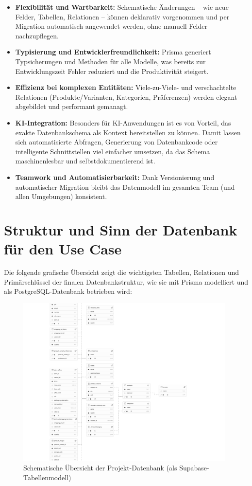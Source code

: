 \begin{itemize}
    \item \textbf{Flexibilität und Wartbarkeit:} Schematische Änderungen – wie neue Felder, Tabellen, Relationen – können deklarativ vorgenommen und per Migration automatisch angewendet werden, ohne manuell Felder nachzupflegen.
    \item \textbf{Typisierung und Entwicklerfreundlichkeit:} Prisma generiert Typsicherungen und Methoden für alle Modelle, was bereits zur Entwicklungszeit Fehler reduziert und die Produktivität steigert.
    \item \textbf{Effizienz bei komplexen Entitäten:} Viele-zu-Viele- und verschachtelte Relationen (Produkte/Varianten, Kategorien, Präferenzen) werden elegant abgebildet und performant gemanagt.
    \item \textbf{KI-Integration:} Besonders für KI-Anwendungen ist es von Vorteil, das exakte Datenbankschema als Kontext bereitstellen zu können. Damit lassen sich automatisierte Abfragen, Generierung von Datenbankcode oder intelligente Schnittstellen viel einfacher umsetzen, da das Schema maschinenlesbar und selbstdokumentierend ist.
    \item \textbf{Teamwork und Automatisierbarkeit:} Dank Versionierung und automatischer Migration bleibt das Datenmodell im gesamten Team (und allen Umgebungen) konsistent.
\end{itemize}

\section{Struktur und Sinn der Datenbank für den Use Case}

Die folgende grafische Übersicht zeigt die wichtigsten Tabellen, Relationen und Primärschlüssel der finalen Datenbankstruktur, wie sie mit Prisma modelliert und als PostgreSQL-Datenbank betrieben wird:

\begin{figure}[h!]
    \centering
    \includegraphics[width=0.98\textwidth]{media/supabase-schema-vgqtxqfvygduzmuwlmba.png}
    \caption{Schematische Übersicht der Projekt-Datenbank (als Supabase-Tabellenmodell)}
    \label{fig:db-schema}
\end{figure}

